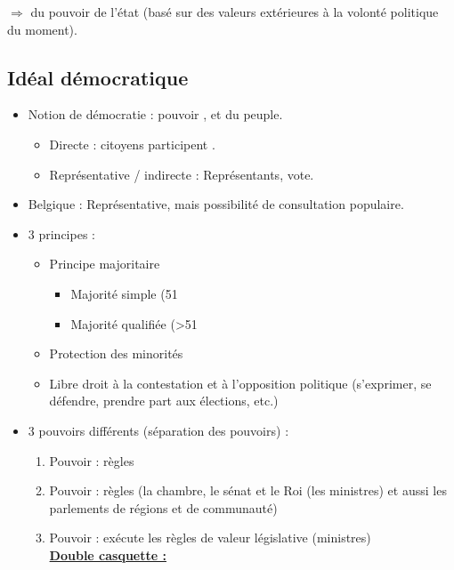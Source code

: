 $\Rightarrow$  du pouvoir de l'état (basé sur des valeurs extérieures à la volonté politique du moment).

\subsection{Idéal démocratique}

\begin{itemize}
    \item Notion de démocratie : pouvoir ,  et  du peuple.
    \begin{itemize}
        \item Directe : citoyens participent .
        \item Représentative / indirecte : Représentants, vote.
    \end{itemize}
    \item Belgique : Représentative, mais possibilité de consultation populaire.
    \item 3 principes :
    \begin{itemize}
        \item Principe majoritaire
        \begin{itemize}
            \item Majorité simple (51%
            \item Majorité qualifiée (>51%
        \end{itemize}
        \item Protection des minorités
        \item Libre droit à la contestation et à l'opposition politique (s'exprimer, se défendre, prendre part aux élections, etc.)
    \end{itemize}
    \item 3 pouvoirs différents (séparation des pouvoirs) :
    \begin{enumerate}
        \item Pouvoir  : règles 
        \item Pouvoir  : règles  (la chambre, le sénat et le Roi (les ministres) et aussi les parlements de régions et de communauté)
        \item Pouvoir  : exécute les règles de valeur législative (ministres)\\
        \underline{\textbf{Double casquette :}}
        \begin{itemize}

\end{itemize}
\end{enumerate}
\end{itemize}
